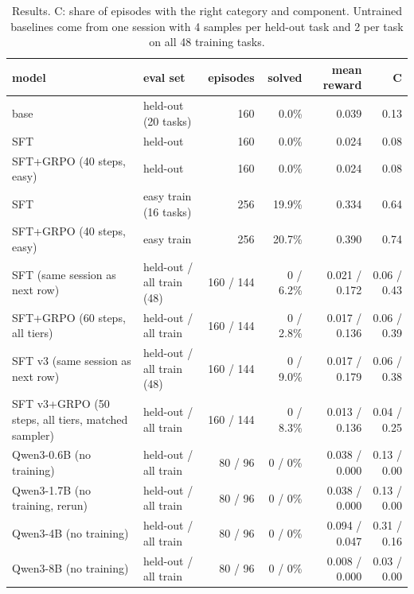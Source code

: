 \documentclass[11pt]{article}
\begin{document}
\begin{table}[h]
\centering
\small
\begin{tabular}{llrrrr}
\toprule
model & eval set & episodes & solved & mean reward & C \\
\midrule
base & held-out (20 tasks) & 160 & 0.0\% & 0.039 & 0.13 \\
SFT & held-out & 160 & 0.0\% & 0.024 & 0.08 \\
SFT+GRPO (40 steps, easy) & held-out & 160 & 0.0\% & 0.024 & 0.08 \\
SFT & easy train (16 tasks) & 256 & 19.9\% & 0.334 & 0.64 \\
SFT+GRPO (40 steps, easy) & easy train & 256 & 20.7\% & 0.390 & 0.74 \\
SFT (same session as next row) & held-out / all train (48) & 160 / 144 & 0 / 6.2\% & 0.021 / 0.172 & 0.06 / 0.43 \\
SFT+GRPO (60 steps, all tiers) & held-out / all train & 160 / 144 & 0 / 2.8\% & 0.017 / 0.136 & 0.06 / 0.39 \\
SFT v3 (same session as next row) & held-out / all train (48) & 160 / 144 & 0 / 9.0\% & 0.017 / 0.179 & 0.06 / 0.38 \\
SFT v3+GRPO (50 steps, all tiers, matched sampler) & held-out / all train & 160 / 144 & 0 / 8.3\% & 0.013 / 0.136 & 0.04 / 0.25 \\
Qwen3-0.6B (no training) & held-out / all train & 80 / 96 & 0 / 0\% & 0.038 / 0.000 & 0.13 / 0.00 \\
Qwen3-1.7B (no training, rerun) & held-out / all train & 80 / 96 & 0 / 0\% & 0.038 / 0.000 & 0.13 / 0.00 \\
Qwen3-4B (no training) & held-out / all train & 80 / 96 & 0 / 0\% & 0.094 / 0.047 & 0.31 / 0.16 \\
Qwen3-8B (no training) & held-out / all train & 80 / 96 & 0 / 0\% & 0.008 / 0.000 & 0.03 / 0.00 \\
\bottomrule
\end{tabular}
\caption{Results. C: share of episodes with the right category and component. Untrained baselines come from one session with 4 samples per held-out task and 2 per task on all 48 training tasks.}
\label{tab:results}
\end{table}
\end{document}
